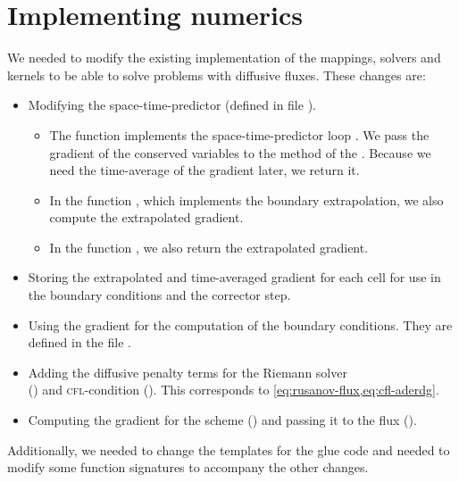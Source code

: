 \section{Implementing numerics}
We needed to modify the existing implementation of the mappings, solvers and kernels to be able to solve problems with diffusive fluxes.
These changes are:
\begin{itemize}
\item Modifying the space-time-predictor (defined in file ).
  \begin{itemize}
  \item The function  implements the space-time-predictor loop .
    We pass the gradient of the conserved variables to the  method of the .
    Because we need the time-average of the gradient later, we return it.
   \item In the function , which implements the boundary extrapolation, we also compute the extrapolated gradient.
    \item In the function , we also return the extrapolated gradient.
  \end{itemize}
\item Storing the extrapolated and time-averaged gradient for each cell for use in the boundary conditions and the corrector step.
\item Using the gradient for the computation of the boundary conditions.
  They are defined in the file .
\item Adding the diffusive penalty terms for the Riemann solver\\() and \textsc{cfl}-condition ().
  This corresponds to \cref{eq:rusanov-flux,eq:cfl-aderdg}.
\item Computing the gradient for the \muscl{} scheme () and passing it to the flux ().
\end{itemize}
Additionally, we needed to change the templates for the glue code and needed to modify some function signatures to accompany the other changes.

